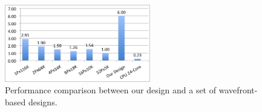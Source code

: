 \begin{figure}[!hbt]
	\begin{center}
		\includegraphics[width=2.5in]{Figures/F2C5.jpg}
		\caption {Performance comparison between our design and a set of wavefront-based designs.}
		\label{fig:F2C5}
	\end{center}
\end{figure}
